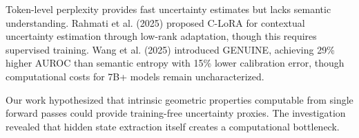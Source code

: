 Token-level perplexity provides fast uncertainty estimates but lacks semantic understanding. Rahmati et al. (2025) proposed C-LoRA for contextual uncertainty estimation through low-rank adaptation, though this requires supervised training. Wang et al. (2025) introduced GENUINE, achieving 29\% higher AUROC than semantic entropy with 15\% lower calibration error, though computational costs for 7B+ models remain uncharacterized.

Our work hypothesized that intrinsic geometric properties computable from single forward passes could provide training-free uncertainty proxies. The investigation revealed that hidden state extraction itself creates a computational bottleneck.
